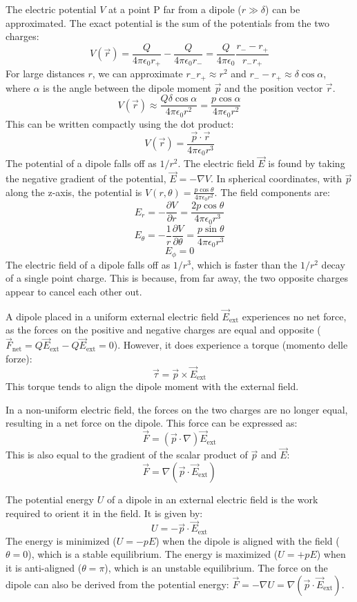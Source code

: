 The electric potential \(V\) at a point P far from a dipole (\(r \gg \delta\)) can be approximated. The exact potential is the sum of the potentials from the two charges:
\[ V(\vec{r}) = \frac{Q}{4\pi\epsilon_0 r_+} - \frac{Q}{4\pi\epsilon_0 r_-} = \frac{Q}{4\pi\epsilon_0} \frac{r_- - r_+}{r_- r_+} \]
For large distances \(r\), we can approximate \(r_- r_+ \approx r^2\) and \(r_- - r_+ \approx \delta \cos\alpha\), where \(\alpha\) is the angle between the dipole moment \(\vec{p}\) and the position vector \(\vec{r}\).
\[ V(\vec{r}) \approx \frac{Q \delta \cos\alpha}{4\pi\epsilon_0 r^2} = \frac{p \cos\alpha}{4\pi\epsilon_0 r^2} \]
This can be written compactly using the dot product:
\[ V(\vec{r}) = \frac{\vec{p} \cdot \vec{r}}{4\pi\epsilon_0 r^3} \]
The potential of a dipole falls off as \(1/r^2\). The electric field \(\vec{E}\) is found by taking the negative gradient of the potential, \(\vec{E} = -\nabla V\). In spherical coordinates, with \(\vec{p}\) along the z-axis, the potential is \(V(r, \theta) = \frac{p \cos\theta}{4\pi\epsilon_0 r^2}\). The field components are:
\[ E_r = -\frac{\partial V}{\partial r} = \frac{2p \cos\theta}{4\pi\epsilon_0 r^3} \]
\[ E_\theta = -\frac{1}{r}\frac{\partial V}{\partial \theta} = \frac{p \sin\theta}{4\pi\epsilon_0 r^3} \]
\[ E_\phi = 0 \]
The electric field of a dipole falls off as \(1/r^3\), which is faster than the \(1/r^2\) decay of a single point charge. This is because, from far away, the two opposite charges appear to cancel each other out.

A dipole placed in a uniform external electric field \(\vec{E}_{\text{ext}}\) experiences no net force, as the forces on the positive and negative charges are equal and opposite (\(\vec{F}_{\text{net}} = Q\vec{E}_{\text{ext}} - Q\vec{E}_{\text{ext}} = 0\)). However, it does experience a torque (momento delle forze):
\[ \vec{\tau} = \vec{p} \times \vec{E}_{\text{ext}} \]
This torque tends to align the dipole moment with the external field.

In a non-uniform electric field, the forces on the two charges are no longer equal, resulting in a net force on the dipole. This force can be expressed as:
\[ \vec{F} = (\vec{p} \cdot \nabla) \vec{E}_{\text{ext}} \]
This is also equal to the gradient of the scalar product of \(\vec{p}\) and \(\vec{E}\):
\[ \vec{F} = \nabla(\vec{p} \cdot \vec{E}_{\text{ext}}) \]

The potential energy \(U\) of a dipole in an external electric field is the work required to orient it in the field. It is given by:
\[ U = - \vec{p} \cdot \vec{E}_{\text{ext}} \]
The energy is minimized (\(U = -pE\)) when the dipole is aligned with the field (\(\theta = 0\)), which is a stable equilibrium. The energy is maximized (\(U = +pE\)) when it is anti-aligned (\(\theta = \pi\)), which is an unstable equilibrium. The force on the dipole can also be derived from the potential energy: \(\vec{F} = -\nabla U = \nabla(\vec{p} \cdot \vec{E}_{\text{ext}})\).
